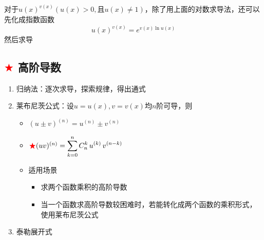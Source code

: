 \documentclass[../book.tex]{subfiles}
\begin{document}
    对于$u(x)^{v(x)}(u(x) > 0, \text{且}u(x) \neq 1)$，除了用上面的对数求导法，还可以先化成指数函数
    \[
        u(x)^{v(x)} = e^{v(x)\ln u(x)}
    \]
    然后求导

    \subsection{\textcolor{red}{$\bigstar$} 高阶导数}
    \begin{enumerate}
        \item 归纳法：逐次求导，探索规律，得出通式
        \item 莱布尼茨公式：设$u = u(x), v = v(x)$均$n$阶可导，则
        \begin{itemize}
            \item $(u \pm v)^{(n)} = u^{(n)} \pm v^{(n)}$
            \item ${\color{red}{\bigstar}}(uv)^{(n)} = \displaystyle\sum_{k=0}^{n}C_n^k\,u^{(k)}\,v^{(n-k)}$
            \item 适用场景
            \begin{itemize}
                \item 求两个函数乘积的高阶导数
                \item 当一个函数求高阶导数较困难时，若能转化成两个函数的乘积形式，使用莱布尼茨公式
            \end{itemize}
        \end{itemize}
        \item 泰勒展开式
\end{enumerate}
\end{document}
